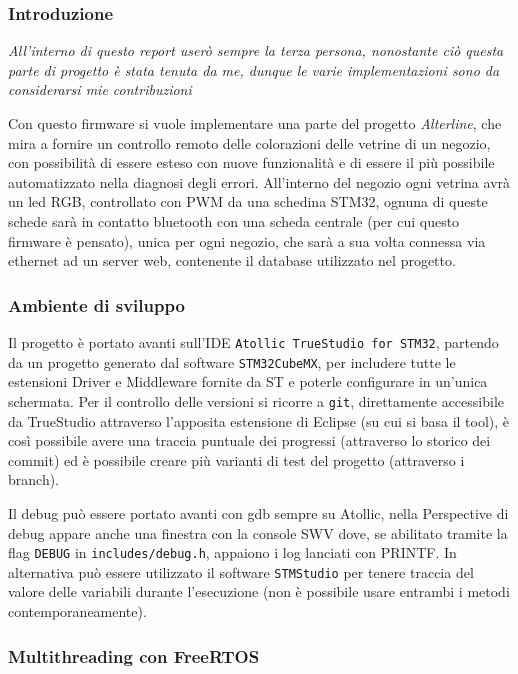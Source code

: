 \subsubsection{Introduzione}

\emph{All'interno di questo report user\`o sempre la terza persona, nonostante ci\`o questa parte di progetto \`e stata tenuta da me, dunque le varie implementazioni sono da considerarsi mie contribuzioni}

Con questo firmware si vuole implementare una parte del progetto \textit{Alterline}, che mira a fornire un controllo remoto delle colorazioni delle vetrine di un negozio, con possibilit\`a di essere esteso con nuove funzionalit\`a e di essere il pi\`u possibile automatizzato nella diagnosi degli errori. All'interno del negozio ogni vetrina avr\`a un led RGB, controllato con PWM da una schedina STM32, ognuna di queste schede sar\`a in contatto bluetooth con una scheda centrale (per cui questo firmware \`e pensato), unica per ogni negozio, che sar\`a a sua volta connessa via ethernet ad un server web, contenente il database utilizzato nel progetto.

\subsubsection{Ambiente di sviluppo}

Il progetto \`e portato avanti sull'IDE \texttt{Atollic TrueStudio for STM32}, partendo da un progetto generato dal software \texttt{STM32CubeMX}, per includere tutte le estensioni Driver e Middleware fornite da ST e poterle configurare in un'unica schermata. Per il controllo delle versioni si ricorre a \texttt{git}, direttamente accessibile da TrueStudio attraverso l'apposita estensione di Eclipse (su cui si basa il tool), \`e cos\`i possibile avere una traccia puntuale dei progressi (attraverso lo storico dei commit) ed \`e possibile creare pi\`u varianti di test del progetto (attraverso i branch).

Il debug pu\`o essere portato avanti con gdb sempre su Atollic, nella Perspective di debug appare anche una finestra con la console SWV dove, se abilitato tramite la flag \texttt{DEBUG} in \texttt{includes/debug.h}, appaiono i log lanciati con PRINTF. In alternativa pu\`o essere utilizzato il software \texttt{STMStudio} per tenere traccia del valore delle variabili durante l'esecuzione (non \`e possibile usare entrambi i metodi contemporaneamente).

\subsubsection{Multithreading con FreeRTOS}

